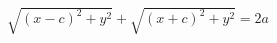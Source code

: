 \documentclass[preview]{standalone}
\begin{document}
\begin{align*}
\sqrt{(x-c)^2+y^2} + \sqrt{(x+c)^2+y^2} = 2a
\end{align*}
\end{document}
